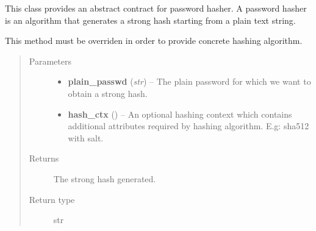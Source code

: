 \documentclass[letterpaper,10pt,english]{sphinxmanual}
\begin{document}
\begin{fulllineitems}
\label{features/oauth2/idp:fantastico.oauth2.passwords_hasher.PasswordsHasher}
This class provides an abstract contract for password hasher. A password hasher is an algorithm that generates a strong
hash starting from a plain text string.

\begin{fulllineitems}
\label{features/oauth2/idp:fantastico.oauth2.passwords_hasher.PasswordsHasher.hash_password}
This method must be overriden in order to provide concrete hashing algorithm.
\begin{quote}\begin{description}
\item[{Parameters}] \leavevmode\begin{itemize}
\item {} 
\textbf{plain\_passwd} (\emph{str}) -- The plain password for which we want to obtain a strong hash.

\item {} 
\textbf{hash\_ctx} () -- An optional hashing context which contains additional attributes required by hashing algorithm. E.g: sha512 with salt.

\end{itemize}

\item[{Returns}] \leavevmode
The strong hash generated.

\item[{Return type}] \leavevmode
str

\end{description}\end{quote}

\end{fulllineitems}


\end{fulllineitems}

\end{document}
